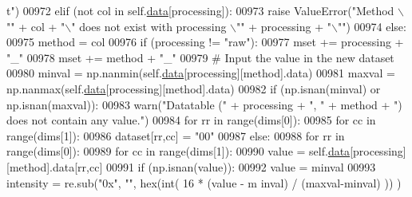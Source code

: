\begin{DoxyCode}
{      t"})
00972                 \textcolor{keywordflow}{elif} (\textcolor{keywordflow}{not} col \textcolor{keywordflow}{in} self.\hyperlink{classnavicom_1_1navicom_1_1NaviCom_aa1abff245573ed8406c6bddb4596f093}{data}[processing]):
00973                     \textcolor{keywordflow}{raise} ValueError(\textcolor{stringliteral}{"Method \(\backslash\)""} + col + \textcolor{stringliteral}{"\(\backslash\)" does not exist with 
      processing \(\backslash\)""} + processing + \textcolor{stringliteral}{"\(\backslash\)""})
00974                 \textcolor{keywordflow}{else}:
00975                     method = col
00976                 \textcolor{keywordflow}{if} (processing != \textcolor{stringliteral}{"raw"}):
00977                     mset += processing + \textcolor{stringliteral}{"\_"}
00978                 mset += method + \textcolor{stringliteral}{"\_"}
00979                 \textcolor{comment}{# Input the value in the new dataset}
00980                 minval = np.nanmin(self.\hyperlink{classnavicom_1_1navicom_1_1NaviCom_aa1abff245573ed8406c6bddb4596f093}{data}[processing][method].data)
00981                 maxval = np.nanmax(self.\hyperlink{classnavicom_1_1navicom_1_1NaviCom_aa1abff245573ed8406c6bddb4596f093}{data}[processing][method].data)
00982                 \textcolor{keywordflow}{if} (np.isnan(minval) \textcolor{keywordflow}{or} np.isnan(maxval)):
00983                     warn(\textcolor{stringliteral}{"Datatable ("} + processing + \textcolor{stringliteral}{", "} + method + \textcolor{stringliteral}{") does not
       contain any value."})
00984                     \textcolor{keywordflow}{for} rr \textcolor{keywordflow}{in} range(dims[0]):
00985                         \textcolor{keywordflow}{for} cc \textcolor{keywordflow}{in} range(dims[1]):
00986                             dataset[rr,cc] = \textcolor{stringliteral}{"00"}
00987                 \textcolor{keywordflow}{else}:
00988                     \textcolor{keywordflow}{for} rr \textcolor{keywordflow}{in} range(dims[0]):
00989                         \textcolor{keywordflow}{for} cc \textcolor{keywordflow}{in} range(dims[1]):
00990                             value = self.\hyperlink{classnavicom_1_1navicom_1_1NaviCom_aa1abff245573ed8406c6bddb4596f093}{data}[processing][method].data[rr,cc]
00991                             \textcolor{keywordflow}{if} (np.isnan(value)):
00992                                 value = minval
00993                             intensity = re.sub(\textcolor{stringliteral}{"0x"}, \textcolor{stringliteral}{""}, hex(int( 16 * (value - m
      inval) / (maxval-minval) )) )

\end{DoxyCode}

